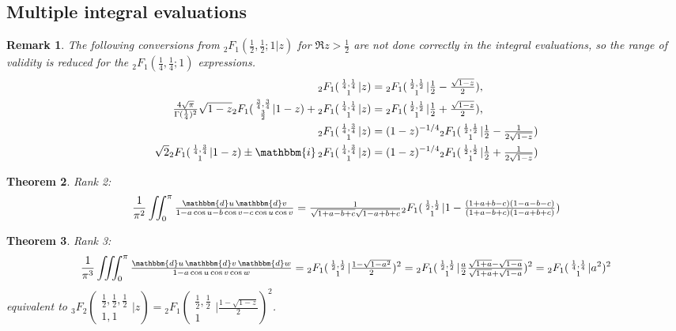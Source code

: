 \documentclass[12pt]{article}
\newcommand{\ii}[0] {\mathbbm{i}}
\newcommand{\dd}[0] {\mathbbm{d}}
\numberwithin{equation}{section}
\newtheorem{theorem}{Theorem}[section]
\newtheorem{remark}[theorem]{Remark}
\newcommand{\Head}[3] {{}_{#1}{#2}_{#3}}
\newcommand{\ArgS}[3] {( \begin{smallmatrix} #1 \\ #2 \end{smallmatrix} | {#3})}
\newcommand{\ArgKS}[1] {\ArgS{\frac12,\frac12}{1}{#1}}
\newcommand{\FFs}[6] {{}_{#1}{#2}_{#3} ( \begin{smallmatrix} #4 \\ #5 \end{smallmatrix} | {#6}  )}
\begin{document}
\subsection{Multiple integral evaluations}
\begin{remark}
The following conversions from $\Head{2}{F}{1}(\frac12, \frac12; 1 | z)$ for $\Re z > \frac12$ are not done correctly in the integral evaluations, so the range of validity is reduced for the $\Head{2}{F}{1}(\frac14, \frac14; 1)$ expressions.
\begin{align*}
\FFs{2}{F}{1}{\frac14,\frac14}{1}{z} &= \Head{2}{F}{1} \ArgKS{\tfrac12 - \tfrac{\sqrt{1-z}}{2}}\text{,}\\
\tfrac{4\sqrt{\pi}}{\Gamma(\frac14)^2} \sqrt{1-z} \Head{2}{F}{1} \ArgS{\frac34,\frac34}{\frac32}{1-z} + \FFs{2}{F}{1}{\frac14,\frac14}{1}{z} &= \Head{2}{F}{1} \ArgKS{\tfrac12 + \tfrac{\sqrt{1-z}}{2}}\text{,}\\
\FFs{2}{F}{1}{\frac14,\frac34}{1}{z} &= (1-z)^{-1/4}\Head{2}{F}{1} \ArgKS{\tfrac12 - \tfrac{1}{2\sqrt{1-z}}}\\
\sqrt{2} \Head{2}{F}{1} \ArgS{\frac14,\frac34}{1}{1-z} \pm \ii \, \FFs{2}{F}{1}{\frac14,\frac34}{1}{z} &= (1-z)^{-1/4}\Head{2}{F}{1} \ArgKS{\tfrac12 + \tfrac{1}{2\sqrt{1-z}}}
\end{align*}
\end{remark}




\begin{theorem} Rank 2:
\label{thm_double_trig_int}
\begin{equation*}
\frac{1}{\pi^2} \iint_0^{\pi} \tfrac{\dd u \, \dd v} {1 - a \cos u - b \cos v - c \cos u \cos v} = \tfrac{1}{\sqrt{1+a-b+c}\sqrt{1-a+b+c}} \Head{2}{F}{1} \ArgKS{1-\tfrac{(1+a+b-c)(1-a-b-c)}{(1+a-b+c)(1-a+b+c)}}
\end{equation*}
\end{theorem}

\begin{theorem} Rank 3:
\begin{equation*}
\frac{1}{\pi^3} \iiint_0^{\pi} \tfrac{\dd u \, \dd v \, \dd w} {1 - a \cos u \cos v \cos w} = \Head{2}{F}{1} \ArgKS{\tfrac{1-\sqrt{1-a^2}}{2}}^2 = \Head{2}{F}{1} \ArgKS{\tfrac{a}{2}\tfrac{\sqrt{1+a}-\sqrt{1-a}}{\sqrt{1+a}+\sqrt{1-a}}}^2 = \Head{2}{F}{1} \ArgS{\frac14,\frac14}{1}{a^2}^2
\end{equation*}
equivalent to $\FFs{3}{F}{2}{\frac12,\frac12,\frac12}{1,1}{z} = \Head{2}{F}{1} \ArgKS{\tfrac{1 -\sqrt{1-z}}{2}}^2$.
\end{theorem}
\end{document}
